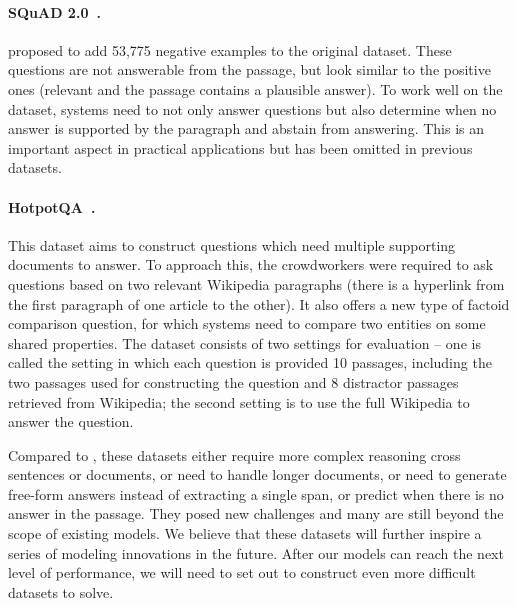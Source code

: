 \paragraph{SQuAD 2.0~\cite{rajpurkar2018know}.}  proposed to add 53,775 negative examples to the original  dataset. These questions are not answerable from the passage, but look similar to the positive ones (relevant and the passage contains a plausible answer). To work well on the dataset, systems need to not only answer questions but also determine when no answer is supported by the paragraph and abstain from answering. This is an important aspect in practical applications but has been omitted in previous datasets.

\paragraph{HotpotQA~\cite{yang2018hotpotqa}.} This dataset aims to construct questions which need multiple supporting documents to answer. To approach this, the crowdworkers were required to ask questions based on two relevant Wikipedia paragraphs (there is a hyperlink from the first paragraph of one article to the other). It also offers a new type of factoid comparison question, for which systems need to compare two entities on some shared properties. The dataset consists of two settings for evaluation -- one is called the  setting in which each question is provided 10 passages, including the two passages used for constructing the question and 8 distractor passages retrieved from Wikipedia; the second setting is to use the full Wikipedia to answer the question.

Compared to , these datasets either require more complex reasoning cross sentences or documents, or need to handle longer documents, or need to generate free-form answers instead of extracting a single span, or predict when there is no answer in the passage. They posed new challenges and many are still beyond the scope of existing models. We believe that these datasets will further inspire a series of modeling innovations in the future. After our models can reach the next level of performance, we will need to set out to construct even more difficult datasets to solve.
